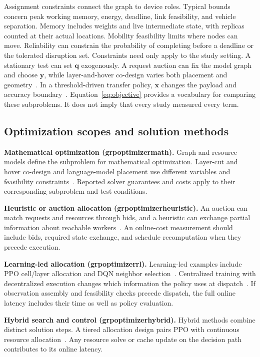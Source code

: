 \documentclass[pdflatex,sn-vancouver-num]{sn-jnl}
\newcommand{\groupcite}[2]{\csname grp#1#2\endcsname}
\begin{document}
Assignment constraints connect the graph to device roles. Typical bounds concern peak working memory, energy, deadline, link feasibility, and vehicle separation. Memory includes weights and live intermediate state, with replicas counted at their actual locations. Mobility feasibility limits where nodes can move. Reliability can constrain the probability of completing before a deadline or the tolerated disruption set. Constraints need only apply to the study setting. A stationary test can set $\mathbf{q}$ exogenously. A request auction can fix the model graph and choose $\mathbf{y}$, while layer-and-hover co-design varies both placement and geometry~\cite{R0006,R0058}. In a threshold-driven transfer policy, $\mathbf{x}$ changes the payload and accuracy boundary~\cite{R0080}. Equation~\ref{eq:objective} provides a vocabulary for comparing these subproblems. It does not imply that every study measured every term.

\subsection{Optimization scopes and solution methods}
\textbf{Mathematical optimization (\groupcite{optimizer}{math}).}
Graph and resource models define the subproblem for mathematical optimization. Layer-cut and hover co-design and language-model placement use different variables and feasibility constraints~\cite{R0006,R0074}. Reported solver guarantees and costs apply to their corresponding subproblem and test conditions.

\textbf{Heuristic or auction allocation (\groupcite{optimizer}{heuristic}).}
An auction can match requests and resources through bids, and a heuristic can exchange partial information about reachable workers~\cite{R0058,R0077}. An online-cost measurement should include bids, required state exchange, and schedule recomputation when they precede execution.

\textbf{Learning-led allocation (\groupcite{optimizer}{rl}).}
Learning-led examples include PPO cell/layer allocation and DQN neighbor selection~\cite{R0019,R0092}. Centralized training with decentralized execution changes which information the policy uses at dispatch~\cite{R0106}. If observation assembly and feasibility checks precede dispatch, the full online latency includes their time as well as policy evaluation.

\textbf{Hybrid search and control (\groupcite{optimizer}{hybrid}).}
Hybrid methods combine distinct solution steps. A tiered allocation design pairs PPO with continuous resource allocation~\cite{R0001}. Any resource solve or cache update on the decision path contributes to its online latency.
\end{document}

